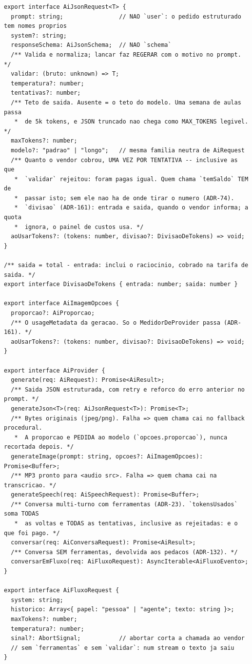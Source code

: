 \begin{lstlisting}[language=tsunoo, caption={\arq{apps/api/src/ai/provider.ts} --- a interface neutra de \emph{vendor}}, label={lst:aiprovider}]
export interface AiJsonRequest<T> {
  prompt: string;                // NAO `user`: o pedido estruturado tem nomes proprios
  system?: string;
  responseSchema: AiJsonSchema;  // NAO `schema`
  /** Valida e normaliza; lancar faz REGERAR com o motivo no prompt. */
  validar: (bruto: unknown) => T;
  temperatura?: number;
  tentativas?: number;
  /** Teto de saida. Ausente = o teto do modelo. Uma semana de aulas passa
   *  de 5k tokens, e JSON truncado nao chega como MAX_TOKENS legivel. */
  maxTokens?: number;
  modelo?: "padrao" | "longo";   // mesma familia neutra de AiRequest
  /** Quanto o vendor cobrou, UMA VEZ POR TENTATIVA -- inclusive as que
   *  `validar` rejeitou: foram pagas igual. Quem chama `temSaldo` TEM de
   *  passar isto; sem ele nao ha de onde tirar o numero (ADR-74).
   *  `divisao` (ADR-161): entrada e saida, quando o vendor informa; a quota
   *  ignora, o painel de custos usa. */
  aoUsarTokens?: (tokens: number, divisao?: DivisaoDeTokens) => void;
}

/** saida = total - entrada: inclui o raciocinio, cobrado na tarifa de saida. */
export interface DivisaoDeTokens { entrada: number; saida: number }

export interface AiImagemOpcoes {
  proporcao?: AiProporcao;
  /** O usageMetadata da geracao. So o MedidorDeProvider passa (ADR-161). */
  aoUsarTokens?: (tokens: number, divisao?: DivisaoDeTokens) => void;
}

export interface AiProvider {
  generate(req: AiRequest): Promise<AiResult>;
  /** Saida JSON estruturada, com retry e reforco do erro anterior no prompt. */
  generateJson<T>(req: AiJsonRequest<T>): Promise<T>;
  /** Bytes originais (jpeg/png). Falha => quem chama cai no fallback procedural.
   *  A proporcao e PEDIDA ao modelo (`opcoes.proporcao`), nunca recortada depois. */
  generateImage(prompt: string, opcoes?: AiImagemOpcoes): Promise<Buffer>;
  /** MP3 pronto para <audio src>. Falha => quem chama cai na transcricao. */
  generateSpeech(req: AiSpeechRequest): Promise<Buffer>;
  /** Conversa multi-turno com ferramentas (ADR-23). `tokensUsados` soma TODAS
   *  as voltas e TODAS as tentativas, inclusive as rejeitadas: e o que foi pago. */
  conversar(req: AiConversaRequest): Promise<AiResult>;
  /** Conversa SEM ferramentas, devolvida aos pedacos (ADR-132). */
  conversarEmFluxo(req: AiFluxoRequest): AsyncIterable<AiFluxoEvento>;
}

export interface AiFluxoRequest {
  system: string;
  historico: Array<{ papel: "pessoa" | "agente"; texto: string }>;
  maxTokens?: number;
  temperatura?: number;
  sinal?: AbortSignal;           // abortar corta a chamada ao vendor
  // sem `ferramentas` e sem `validar`: num stream o texto ja saiu
}


\end{lstlisting}
